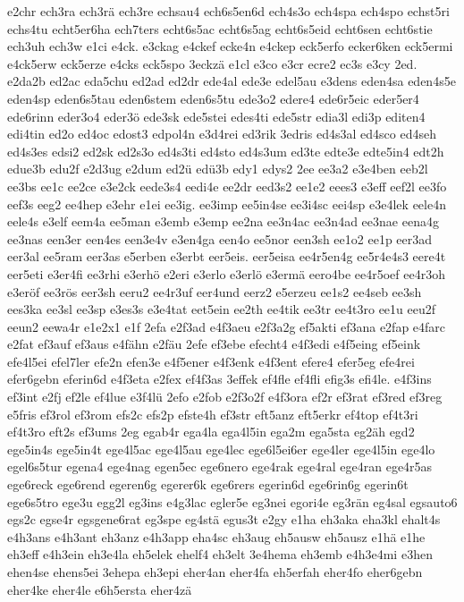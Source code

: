 {e2chr
ech3ra
ech3rä
ech3re
echsau4
ech6s5en6d
ech4s3o
ech4spa
ech4spo
echst5ri
echs4tu
echt5er6ha
ech7ters
echt6s5ac
echt6s5ag
echt6s5eid
echt6sen
echt6stie
ech3uh
ech3w
e1ci
e4ck.
e3ckag
e4ckef
ecke4n
e4ckep
eck5erfo
ecker6ken
eck5ermi
e4ck5erw
eck5erze
e4cks
eck5spo
3eckzä
e1cl
e3co
e3cr
ecre2
ec3s
e3cy
2ed.
e2da2b
ed2ac
eda5chu
ed2ad
ed2dr
ede4al
ede3e
edel5au
e3dens
eden4sa
eden4s5e
eden4sp
eden6s5tau
eden6stem
eden6s5tu
ede3o2
edere4
ede6r5eic
eder5er4
ede6rinn
eder3o4
eder3ö
ede3sk
ede5stei
edes4ti
ede5str
edia3l
edi3p
editen4
edi4tin
ed2o
ed4oc
edost3
edpol4n
e3d4rei
ed3rik
3edris
ed4s3al
ed4sco
ed4seh
ed4s3es
edsi2
ed2sk
ed2s3o
ed4s3ti
ed4sto
ed4s3um
ed3te
edte3e
edte5in4
edt2h
edue3b
edu2f
e2d3ug
e2dum
ed2ü
edü3b
edy1
edys2
2ee
ee3a2
e3e4ben
eeb2l
ee3bs
ee1c
ee2ce
e3e2ck
eede3s4
eedi4e
ee2dr
eed3s2
ee1e2
eees3
e3eff
eef2l
ee3fo
eef3s
eeg2
ee4hep
e3ehr
e1ei
ee3ig.
ee3imp
ee5in4se
ee3i4sc
eei4sp
e3e4lek
eele4n
eele4s
e3elf
eem4a
ee5man
e3emb
e3emp
ee2na
ee3n4ac
ee3n4ad
ee3nae
eena4g
ee3nas
een3er
een4es
een3e4v
e3en4ga
een4o
ee5nor
een3sh
ee1o2
ee1p
eer3ad
eer3al
ee5ram
eer3as
e5erben
e3erbt
eer5eis.
eer5eisa
ee4r5en4g
ee5r4e4s3
eere4t
eer5eti
e3er4fi
ee3rhi
e3erhö
e2eri
e3erlo
e3erlö
e3ermä
eero4be
ee4r5oef
ee4r3oh
e3eröf
ee3rös
eer3sh
eeru2
ee4r3uf
eer4und
eerz2
e5erzeu
ee1s2
ee4seb
ee3sh
ees3ka
ee3sl
ee3sp
e3es3s
e3e4tat
eet5ein
ee2th
ee4tik
ee3tr
ee4t3ro
ee1u
eeu2f
eeun2
eewa4r
e1e2x1
e1f
2efa
e2f3ad
e4f3aeu
e2f3a2g
ef5akti
ef3ana
e2fap
e4farc
e2fat
ef3auf
ef3aus
e4fähn
e2fäu
2efe
ef3ebe
efecht4
e4f3edi
e4f5eing
ef5eink
efe4l5ei
efel7ler
efe2n
efen3e
e4f5ener
e4f3enk
e4f3ent
efere4
efer5eg
efe4rei
efer6gebn
eferin6d
e4f3eta
e2fex
ef4f3as
3effek
ef4fle
ef4fli
efig3s
efi4le.
e4f3ins
ef3int
e2fj
ef2le
ef4lue
e3f4lü
2efo
e2fob
e2f3o2f
e4f3ora
ef2r
ef3rat
ef3red
ef3reg
e5fris
ef3rol
ef3rom
efs2c
efs2p
efste4h
ef3str
eft5anz
eft5erkr
ef4top
ef4t3ri
ef4t3ro
eft2s
ef3ums
2eg
egab4r
ega4la
ega4l5in
ega2m
ega5sta
eg2äh
egd2
ege5in4s
ege5in4t
ege4l5ac
ege4l5au
ege4lec
ege6l5ei6er
ege4ler
ege4l5in
ege4lo
egel6s5tur
egena4
ege4nag
egen5ec
ege6nero
ege4rak
ege4ral
ege4ran
ege4r5as
ege6reck
ege6rend
egeren6g
egerer6k
ege6rers
egerin6d
ege6rin6g
egerin6t
ege6s5tro
ege3u
egg2l
eg3ins
e4g3lac
egler5e
eg3nei
egori4e
eg3rän
eg4sal
egsauto6
egs2c
egse4r
egsgene6rat
eg3spe
eg4stä
egus3t
e2gy
e1ha
eh3aka
eha3kl
ehalt4s
e4h3ans
e4h3ant
eh3anz
e4h3app
eha4sc
eh3aug
eh5ausw
eh5ausz
e1hä
e1he
eh3eff
e4h3ein
eh3e4la
eh5elek
ehelf4
eh3elt
3e4hema
eh3emb
e4h3e4mi
e3hen
ehen4se
ehens5ei
3ehepa
eh3epi
eher4an
eher4fa
eh5erfah
eher4fo
eher6gebn
eher4ke
eher4le
e6h5ersta
eher4zä
}
